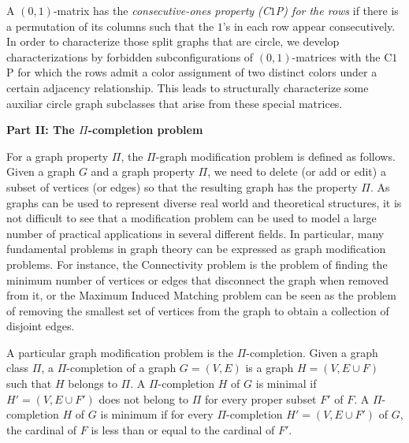 \documentclass[12pt]{book}
\theoremstyle{plain}
\theoremstyle{remark}
\begin{document}
A $(0,1)$-matrix has the \emph{consecutive-ones property (C$1$P) for the rows }if there is a permutation of its columns such that the $1$'s in each row appear consecutively. In order to characterize those split graphs that are circle, we develop characterizations by forbidden subconfigurations of $(0,1)$-matrices with the C$1$P for which the rows admit a color assignment of two distinct colors under a certain adjacency relationship. This leads to structurally characterize some auxiliar circle graph subclasses that arise from these special matrices. 

\vspace{6mm}
\textbf{Part II: The $\Pi$-completion problem}
\vspace{3mm}

For a graph property $\Pi$, the $\Pi$-graph modification problem is defined as follows. 
Given a graph $G$ and a graph property $\Pi$, we need to delete (or add or edit) a subset of vertices (or edges) so that the resulting graph has the property $\Pi$.
As graphs can be used to represent diverse real world and theoretical structures, it is not difficult to see that a modification problem can be used to model a large number of practical applications in several different fields. In particular, many fundamental problems in graph theory can be expressed as graph modification problems. For instance, the Connectivity problem is the problem of finding the minimum number of vertices or edges that disconnect the graph when removed from it, or the Maximum Induced Matching problem can be seen as the problem of removing the smallest set of vertices from the graph to obtain a collection of disjoint edges.

A particular graph modification problem is the $\Pi$-completion. Given a graph class $\Pi$, a $\Pi$-completion of a graph $G = (V,E)$ is a graph $H = (V, E \cup F)$ such that $H$ belongs to $\Pi$. 
A $\Pi$-completion $H$ of $G$ is minimal if $H'= (V, E \cup F')$ does not belong to $\Pi$ for every proper subset $F'$ of $F$. 
A $\Pi$-completion $H$ of $G$ is minimum if for every $\Pi$-completion $H' = (V, E \cup F')$ of $G$, the cardinal of $F$ is less than or equal to the cardinal of $F'$.
\end{document}
